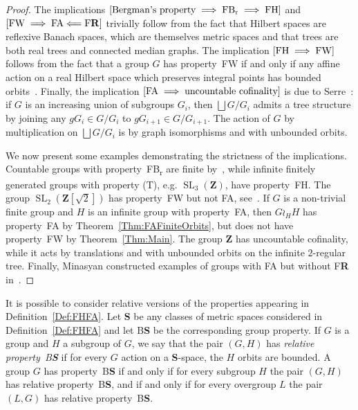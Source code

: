 \documentclass[a4paper]{article}
\theoremstyle{definition}
\DeclareMathOperator\SL{SL}
\newcommand*{\field}[1]{\mathbf{#1}}
\newcommand*{\category}[1]{\textbf{#1}}
\newcommand*{\CatS}{\category{S}}
\newcommand*{\Z}{\field{Z}}
\newcommand*{\BS}{B\textbf{S}}
\newcommand*{\FB}{FB\textsubscript{r}}
\newcommand*{\FH}{FH}
\newcommand*{\FW}{FW}
\newcommand*{\FA}{FA}
\newcommand*{\FR}{F\textbf{R}}
\begin{document}
\begin{proof}
The implications $[\textnormal{Bergman's property}\implies \textnormal{\FB}\implies\textnormal{\FH}]$ and $[\textnormal{\FW}\implies \textnormal{\FA}\Longleftarrow\textnormal{\FR}]$ trivially follow from the fact that Hilbert spaces are reflexive Banach spaces, which are themselves metric spaces and that trees are both real trees and connected median graphs.
The implication $[\textnormal{\FH}\implies \textnormal{\FW}]$ follows from the fact that a group $G$ has property~\FW{} if and only if any affine action on a real Hilbert space which preserves integral points has bounded orbits~\cite{Cornulier2013}.
Finally, the implication $[\textnormal{\FA}\implies\textnormal{uncountable cofinality}]$ is due to Serre~\cite{MR0476875}: if $G$ is an increasing union of subgroups $G_i$, then $\bigsqcup G/G_i$ admits a tree structure by joining any $gG_i\in G/G_i$ to $gG_{i+1}\in G/G_{i+1}$.
The action of $G$ by multiplication on $\bigsqcup G/G_i$ is by graph isomorphisms and with unbounded orbits.


We now present some examples demonstrating the strictness of the implications. %
Countable groups with property~\FB{} are finite by~\cite{MR2137870}, while infinite finitely generated groups with property (T), e.g. $\SL_3(\Z)$, have property~\FH.
The group $\SL_2(\Z[\sqrt{2}])$ has property~\FW{} but not \FA, see~\cite{MR3299841}.
If $G$ is a non-trivial finite group and $H$ is an infinite group with property~\FA, then $G\wr_HH$ has property~\FA{} by Theorem~\ref{Thm:FAFiniteOrbits}, but does not have property~\FW{} by Theorem~\ref{Thm:Main}.
The group $\Z$ has uncountable cofinality, while it acts by translations and with unbounded orbits on the infinite $2$-regular tree.
Finally, Minasyan constructed examples of groups with \FA{} but without \FR{} in~\cite{MR3465847}.
\end{proof}
%
%
It is possible to consider relative versions of the properties appearing in Definition~\ref{Def:FHFA}.
Let \CatS{} be any classes of metric spaces considered in Definition~\ref{Def:FHFA} and let \BS{} be the corresponding group property.
If $G$ is a group and $H$ a subgroup of $G$, we say that the pair $(G,H)$ has \emph{relative property~\BS} if for every $G$ action on a \CatS-space, the $H$ orbits are bounded.
A group $G$ has property~\BS{} if and only if for every subgroup $H$ the pair $(G,H)$ has relative property~\BS{}, and if and only if for every overgroup $L$ the pair $(L,G)$ has relative property~\BS.
%
%
%
%
%
%
%
%
%
\end{document}
